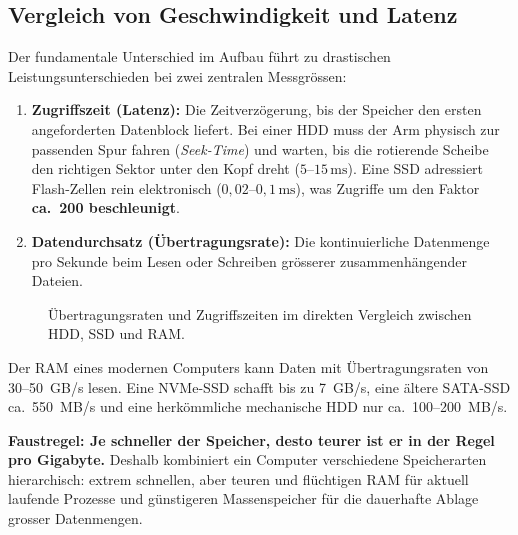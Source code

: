 \subsection{Vergleich von Geschwindigkeit und Latenz}

Der fundamentale Unterschied im Aufbau führt zu drastischen Leistungsunterschieden bei zwei zentralen Messgrössen:
\begin{enumerate}
    \item \textbf{Zugriffszeit (Latenz):} Die Zeitverzögerung, bis der Speicher den ersten angeforderten Datenblock liefert. Bei einer \gls{HDD} muss der Arm physisch zur passenden Spur fahren (\emph{Seek-Time}) und warten, bis die rotierende Scheibe den richtigen Sektor unter den Kopf dreht ($5\text{--}15\,\mathrm{ms}$). Eine \gls{SSD} adressiert Flash-Zellen rein elektronisch ($0{,}02\text{--}0{,}1\,\mathrm{ms}$), was Zugriffe um den Faktor \textbf{ca.\ 200 beschleunigt}.
    \item \textbf{Datendurchsatz (Übertragungsrate):} Die kontinuierliche Datenmenge pro Sekunde beim Lesen oder Schreiben grösserer zusammenhängender Dateien.
\end{enumerate}

\begin{figure}[H]
    \centering
    \resizebox{\textwidth}{!}{%
        
    }
    \caption{Übertragungsraten und Zugriffszeiten im direkten Vergleich zwischen \gls{HDD}, \gls{SSD} und \gls{RAM}.}
    \label{fig:speed_vergleich}
\end{figure}

\begin{myexample}
    Der \gls{RAM} eines modernen Computers kann Daten mit Übertragungsraten von 30--50~GB/s lesen. Eine \gls{NVMe}-\gls{SSD} schafft bis zu 7~GB/s, eine ältere \gls{SATA}-\gls{SSD} ca.\ 550~MB/s und eine herkömmliche mechanische \gls{HDD} nur ca.\ 100--200~MB/s.

    \textbf{Faustregel: Je schneller der Speicher, desto teurer ist er in der Regel pro Gigabyte.} Deshalb kombiniert ein Computer verschiedene Speicherarten hierarchisch: extrem schnellen, aber teuren und flüchtigen \gls{RAM} für aktuell laufende Prozesse und günstigeren Massenspeicher für die dauerhafte Ablage grosser Datenmengen.
\end{myexample}

